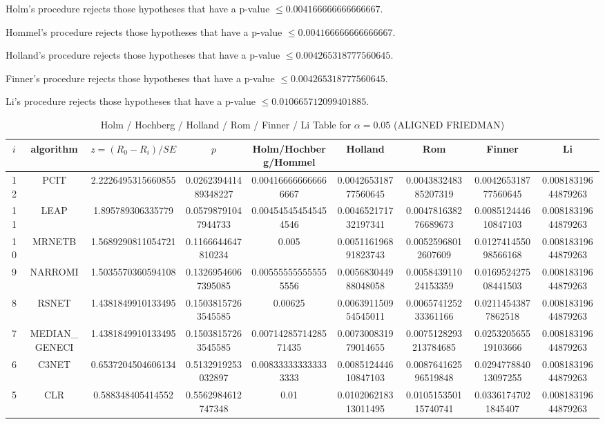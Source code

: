 \documentclass[a4paper,10pt]{article}
\begin{document}
\begin{landscape}
Holm's procedure rejects those hypotheses that have a p-value $\le0.004166666666666667$.


Hommel's procedure rejects those hypotheses that have a p-value $\le0.004166666666666667$.


Holland's procedure rejects those hypotheses that have a p-value $\le0.004265318777560645$.


Finner's procedure rejects those hypotheses that have a p-value $\le0.004265318777560645$.


Li's procedure rejects those hypotheses that have a p-value $\le0.010665712099401885$.



\newpage

\begin{table}[!htp]
\centering\scriptsize
\caption{Holm / Hochberg / Holland / Rom / Finner / Li Table for $\alpha=0.05$ (ALIGNED FRIEDMAN)}
\begin{tabular}{ccccccccc}
$i$&algorithm&$z=(R_0 - R_i)/SE$&$p$&Holm/Hochberg/Hommel&Holland&Rom&Finner&Li\\
\hline
12&PCIT&2.2226495315660855&0.026239441489348227&0.004166666666666667&0.004265318777560645&0.004383248385207319&0.004265318777560645&0.00818319644879263\\
11&LEAP&1.895789306335779&0.05798791047944733&0.004545454545454546&0.004652171732197341&0.004781638276689673&0.008512444610847103&0.00818319644879263\\
10&MRNETB&1.5689290811054721&0.1166644647810234&0.005&0.005116196891823743&0.00525968012607609&0.012741455098566168&0.00818319644879263\\
9&NARROMI&1.5035570360594108&0.13269546067395085&0.005555555555555556&0.005683044988048058&0.005843911024153359&0.016952427508441503&0.00818319644879263\\
8&RSNET&1.4381849910133495&0.15038157263545585&0.00625&0.006391150954545011&0.006574125233361166&0.02114543877862518&0.00818319644879263\\
7&MEDIAN_GENECI&1.4381849910133495&0.15038157263545585&0.0071428571428571435&0.007300831979014655&0.0075128293213784685&0.025320565519103666&0.00818319644879263\\
6&C3NET&0.6537204504606134&0.5132919253032897&0.008333333333333333&0.008512444610847103&0.008764162596519848&0.029477884013097255&0.00818319644879263\\
5&CLR&0.588348405414552&0.5562984612747348&0.01&0.010206218313011495&0.010515350115740741&0.03361747021845407&0.00818319644879263\\

\end{tabular}
\end{table}
\end{landscape}
\end{document}
